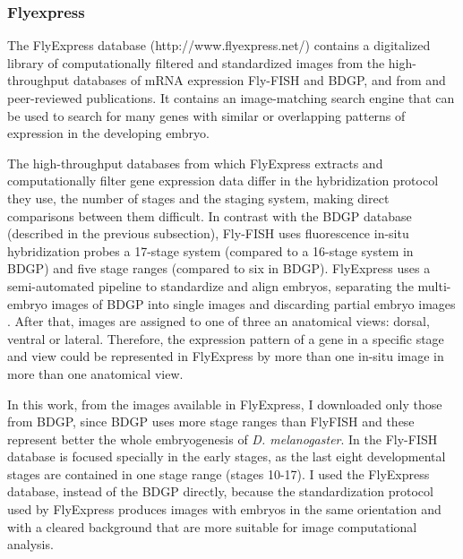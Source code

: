 
\subsubsection{Flyexpress}

The FlyExpress database (http://www.flyexpress.net/) contains a digitalized library of computationally filtered and standardized images from the high-throughput databases of mRNA expression Fly-FISH and BDGP, and from and peer-reviewed publications. It contains an image-matching search engine that can be used to search for many genes with similar or overlapping patterns of expression in the developing embryo.

The high-throughput databases from which FlyExpress extracts and computationally filter gene expression data differ in the hybridization protocol they use, the number of stages and the staging system, making direct comparisons between them difficult.
In contrast with the BDGP database (described in the previous subsection), Fly-FISH uses fluorescence in-situ hybridization probes \citep{Lecuyer2007} a 17-stage system (compared to a 16-stage system in BDGP) and five stage ranges (compared to six in BDGP).
FlyExpress uses a semi-automated pipeline to standardize and align embryos, separating the multi- embryo images of BDGP into single images and discarding partial embryo images \citep{Konikoff2012}. 
After that, images are assigned to one of three an anatomical views: dorsal, ventral or lateral. Therefore, the expression pattern of a gene in a specific stage and view could be represented in FlyExpress by more than one in-situ image in more than one anatomical view.


In this work, from the images available in FlyExpress, I downloaded only those from BDGP, since BDGP uses more stage ranges than FlyFISH and these represent better the whole embryogenesis of \textit{D. melanogaster}. In the Fly-FISH database is focused specially in the early stages, as the last eight developmental stages are contained in one stage range (stages 10-17).
I used the FlyExpress database, instead of the BDGP directly, because the standardization protocol used by FlyExpress produces images with embryos in the same orientation and with a cleared background that are more suitable for image computational analysis.

